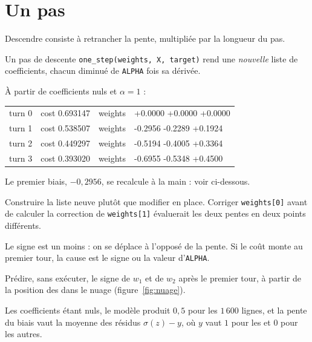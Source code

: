 \section{Un pas}

Descendre consiste à retrancher la pente, multipliée par la longueur du pas.

\begin{tache}{Un pas de descente}
 \texttt{one\_step(weights, X, target)} rend une \emph{nouvelle}
liste de coefficients, chacun diminué de \texttt{ALPHA} fois sa dérivée.

 À partir de coefficients nuls et $\alpha=1$ :
\begin{center}\ttfamily\footnotesize
\begin{tabular}{@{}llll@{}}
turn 0 & cost 0.693147 & weights & +0.0000 +0.0000 +0.0000\\
turn 1 & cost 0.538507 & weights & -0.2956 -0.2289 +0.1924\\
turn 2 & cost 0.449297 & weights & -0.5194 -0.4005 +0.3364\\
turn 3 & cost 0.393020 & weights & -0.6955 -0.5348 +0.4500\\
\end{tabular}
\end{center}
Le premier biais, $-0{,}2956$, se recalcule à la main : voir ci-dessous.

 Construire la liste neuve plutôt que modifier en place.
Corriger \texttt{weights[0]} avant de calculer la correction de
\texttt{weights[1]} évaluerait les deux pentes en deux points différents.

 Le signe est un moins : on se déplace à l'opposé de la pente.
Si le coût monte au premier tour, la cause est le signe ou la valeur d'\texttt{ALPHA}.

 Prédire, sans exécuter, le signe de $w_1$ et de $w_2$ après le
premier tour, à partir de la position des \Gryf dans le nuage
(figure~\ref{fig:nuage}).
\end{tache}

Les coefficients étant nuls, le modèle produit $0{,}5$ pour les $1\,600$ lignes,
et la pente du biais vaut la moyenne des résidus $\sigma(z)-y$, où $y$ vaut $1$
pour les \Gryf et $0$ pour les autres.

